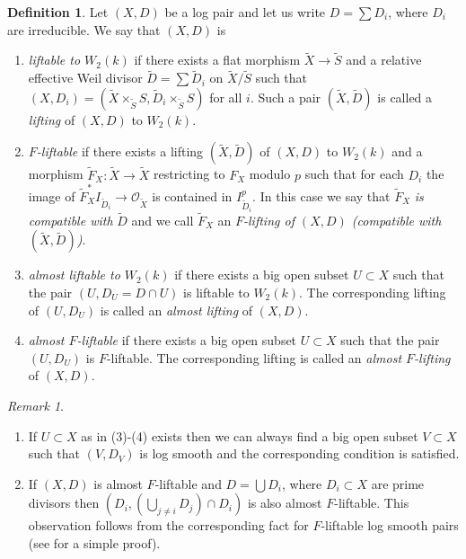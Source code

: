 \documentclass[12pt]{article}
\theoremstyle{plain}
\theoremstyle{definition}
\newtheorem{Definition}[Thm]{Definition}
\theoremstyle{remark}
\newtheorem{Remark}[Thm]{Remark}
\newcommand{\cO}{{\mathcal O}}
\begin{document}
\begin{Definition}\label{definition-F-liftable}
	Let $(X, D)$ be a log pair and let us write $D=\sum D_i$, where $D_i$ are irreducible. 
	We say that $(X,D)$ is
	\begin{enumerate}
	\item \emph{liftable to $W_2(k)$} if there exists a flat morphism $\tilde X\to \tilde S$ and 
a relative effective Weil divisor $\tilde D=\sum \tilde D_i$ on $\tilde X/\tilde S$ such that $(X,D_i)= (\tilde X\times _{\tilde S}S , \tilde D_i\times _{\tilde S}S)$ for all $i$. 
Such a pair 
		$(\tilde X, \tilde D)$ is called a \emph{lifting} of $(X, D)$ to $W_2(k)$. 
	\item \emph{$F$-liftable} if there exists a lifting  $(\tilde X, \tilde D)$  of $(X, D)$ to $W_2(k)$
and a morphism $\tilde F_X: \tilde X\to \tilde X$ restricting to $F_X$ modulo $p$ such that
for each $D_i$ the image of $\tilde F_X^*I_{\tilde D_i}\to \cO_{\tilde X}$ is contained in  $ I_{\tilde D_i}^p$. In this case we say that $\tilde F_X$ \emph{is compatible with} $\tilde D$ and we call $\tilde F_X$ an \emph{$F$-lifting of $(X,D)$ (compatible with $(\tilde X, \tilde D)$)}.
\item \emph{almost liftable to $W_2(k)$}  if there exists a big open subset $U\subset X$ such that the pair $(U, D_U=D\cap U)$ is liftable to $W_2(k)$. The corresponding lifting of $(U, D_U)$ is called an \emph{almost lifting} of $(X,D)$.
	\item \emph{almost $F$-liftable} if there exists a big open subset $U\subset X$ such that the pair
	$(U, D_U)$ is $F$-liftable. The corresponding lifting  is called an \emph{almost $F$-lifting} of $(X,D)$.	
\end{enumerate}
\end{Definition}

\begin{Remark}
	\begin{enumerate}
		\item 
		If $U\subset X$ as in (3)-(4) exists then we can always find a big open subset $V\subset X$
		such that $(V, D_V)$ is log smooth and the corresponding condition is satisfied.
		\item 
		If $(X, D)$ is almost $F$-liftable and $D=\bigcup D_i$, where $D_i\subset X$ are prime divisors then $(D_i, (\bigcup _{j\ne i }D_j)\cap D_i)$  is also almost $F$-liftable. This observation follows from the corresponding fact for $F$-liftable log smooth pairs (see \cite[Lemma 3.2]{AWZ2} for a simple proof).
	\end{enumerate}
\end{Remark}
\end{document}
